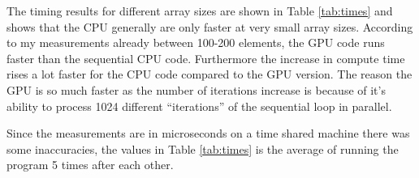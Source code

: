 The timing results for different array sizes are shown in Table \ref{tab:times}
and shows that the CPU generally are only faster at very small array sizes.
According to my measurements already between 100-200 elements, the GPU code runs
faster than the sequential CPU code. Furthermore the increase in compute time
rises a lot faster for the CPU code compared to the GPU version. The reason the
GPU is so much faster as the number of iterations increase is because of it's
ability to process 1024 different ``iterations'' of the sequential loop in
parallel.

Since the measurements are in microseconds on a time shared machine there was
some inaccuracies, the values in Table \ref{tab:times} is the average of running
the program 5 times after each other.
